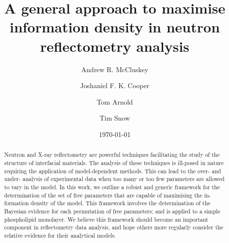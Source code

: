 \documentclass[
 reprint,
 superscriptaddress,
 amsmath,amssymb,
 aps,
]{revtex4-1}
\begin{document}

\title{A general approach to maximise information density in neutron reflectometry analysis}

\author{Andrew R. McCluskey}

\author{Joshaniel F. K. Cooper}
 
\author{Tom Arnold}

\author{Tim Snow}

\date{\today}

\begin{abstract}
Neutron and X-ray reflectometry are powerful techniques facilitating the study of the structure of interfacial materials.
The analysis of these techniques is ill-posed in nature requiring the application of model-dependent methods.
This can lead to the over- and under- analysis of experimental data when too many or too few parameters are allowed to vary in the model. 
In this work, we outline a robust and generic framework for the determination of the set of free parameters that are capable of maximising the in-formation density of the model. 
This framework involves the determination of the Bayesian evidence for each permutation of free parameters; and is applied to a simple phospholipid monolayer. 
We believe this framework should become an important component in reflectometry data analysis, and hope others more regularly consider the relative evidence for their analytical models.
\end{abstract}
\end{document}
